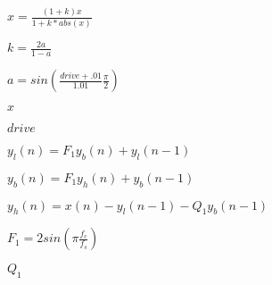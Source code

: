 \documentclass{article}
\begin{document}
$x=\frac{(1+k)x}{1+k*abs(x)}$
\pagebreak

$k=\frac{2a}{1-a}$
\pagebreak

$a=sin(\frac{drive+.01}{1.01}\frac{\pi}{2})$
\pagebreak

$x$
\pagebreak

$drive$
\pagebreak

$y_l(n) = F_1y_b(n) + y_l(n-1)$
\pagebreak

$y_b(n) = F_1y_h(n) + y_b(n-1)$
\pagebreak

$y_h(n) = x(n) - y_l(n-1) - Q_1y_b(n-1)$
\pagebreak

$F_1 = 2sin(\pi \frac{f_c}{f_s})$
\pagebreak

$Q_1$
\pagebreak
\end{document}
